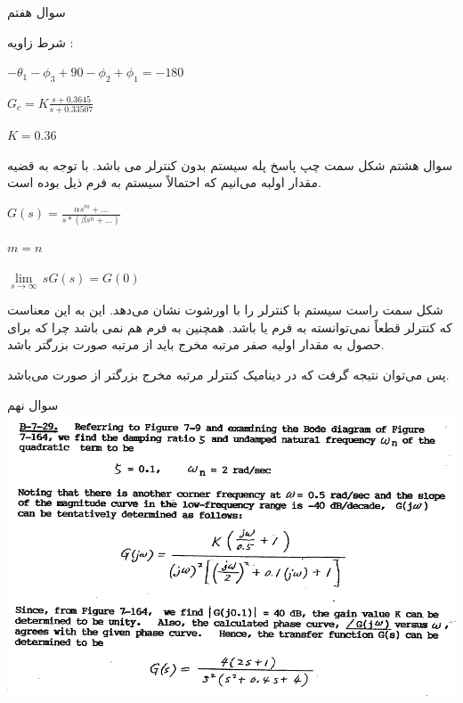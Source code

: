 \documentclass{article}
\begin{document}
\begin{problem}{سوال هفتم}
	\raggedright
	شرط زاویه : 
	
	\raggedleft
	$-\theta_1 -\phi_3 +90 -\phi_2 +\phi_1 = -180$
	
	$G_c = K\frac{s + 0.3645}{s + 0.33507}$
	
	$K = 0.36$
	
	
\end{problem}


\begin{problem}{سوال هشتم}
	شکل سمت چپ پاسخ پله سیستم بدون کنترلر می باشد. با توجه به قضیه مقدار اولبه می‌انیم که احتمالاً سیستم به فرم ذیل بوده است.
	
	\raggedleft
	$G(s) = \frac{\alpha s^m+...}{s*(\beta s^n + ...)}$
	
	$m = n$
	
	$\underset{s\to \infty }{\mathop{\lim }}\,sG(s)=G(0)$
	
	\raggedright
	شکل سمت راست سیستم با کنترلر را با اورشوت نشان می‌دهد. این به این معناست که کنترلر قطعاً نمی‌توانسته به فرم  یا  باشد. همچنین به فرم  هم نمی باشد چرا که برای حصول به مقدار اولیه صفر مرتبه مخرج باید از مرتبه صورت بزرگتر باشد. 
	
	پس می‌توان نتیجه گرفت که در دینامیک کنترلر مرتبه مخرج بزرگتر از صورت می‌باشد.
	

\end{problem}


\begin{problem}{سوال نهم}
	\includegraphics[scale=0.8]{Resources/6.png}
	
	
\end{problem}
\end{document}

